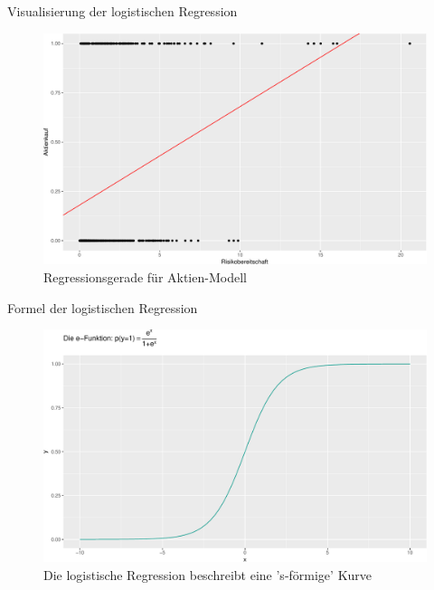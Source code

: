 \begin{frame}{Visualisierung der logistischen Regression}

\begin{figure}

{\centering \includegraphics[width=0.5\linewidth]{PraDa_Folien_nm_2_files/figure-beamer/fig-logist-regr2-1} 

}

\caption{Regressionsgerade für Aktien-Modell}\label{fig:fig-logist-regr2}
\end{figure}

\end{frame}

\begin{frame}{Formel der logistischen Regression}

\begin{figure}

{\centering \includegraphics[width=0.8\linewidth]{PraDa_Folien_nm_2_files/figure-beamer/logist-curve-1} 

}

\caption{Die logistische Regression beschreibt eine 's-förmige' Kurve}\label{fig:logist-curve}
\end{figure}

\end{frame}


